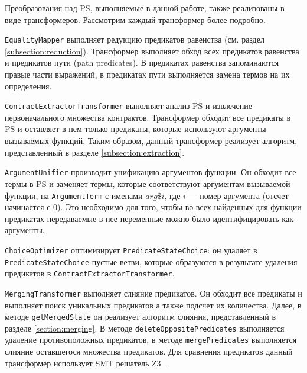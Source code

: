 Преобразования над PS, выполняемые в данной работе, также реализованы в виде трансформеров. Рассмотрим каждый трансформер более подробно.

\texttt{EqualityMapper} выполняет редукцию предикатов равенства (см. раздел \ref{subsection:reduction}). Трансформер выполняет обход всех предикатов равенства и предикатов пути (path predicates). В предикатах равенства запоминаются правые части выражений, в предикатах пути выполняется замена термов на их определения.

\texttt{ContractExtractorTransformer} выполняет анализ PS и извлечение первоначального множества контрактов. Трансформер обходит все предикаты в PS и оставляет в нем только предикаты, которые используют аргументы вызываемых функций. Таким образом, данный трансформер реализует алгоритм, представленный в разделе \ref{subsection:extraction}.

\texttt{ArgumentUnifier} производит унификацию аргументов функции. Он обходит все термы в PS и заменяет термы, которые соответствуют аргументам вызываемой функции, на \texttt{ArgumentTerm} с именами $arg\$i$, где $i$ --- номер аргумента (отсчет начинается с 0). Это необходимо для того, чтобы во всех найденных для функции предикатах передаваемые в нее переменные можно было идентифицировать как аргументы.

\texttt{ChoiceOptimizer} оптимизирует \texttt{PredicateStateChoice}: он удаляет в \texttt{PredicateStateChoice} пустые ветви, которые образуются в результате удаления предикатов в \texttt{ContractExtractorTransformer}.

\texttt{MergingTransformer} выполняет слияние предикатов. Он обходит все предикаты и выполняет поиск уникальных предикатов а также подсчет их количества. Далее, в методе \texttt{getMergedState} он реализует алгоритм слияния, представленный в разделе \ref{section:merging}. В методе \texttt{deleteOppositePredicates} выполняется удаление противоположных предикатов, в методе \texttt{mergePredicates} выполняется слияние оставшегося множества предикатов. Для сравнения предикатов данный трансформер использует SMT решатель Z3~\cite{z3solver}.

